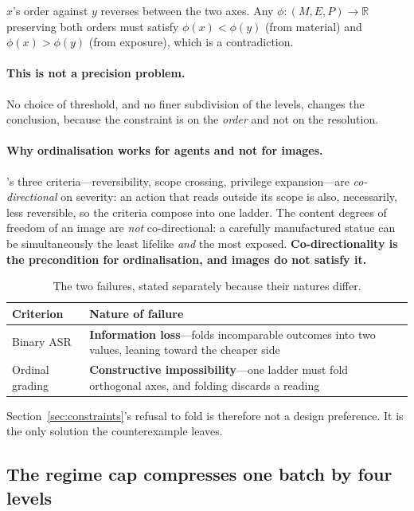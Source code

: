 \documentclass[11pt]{article}
\newcommand{\axm}{M}
\newcommand{\axe}{E}
\newcommand{\axp}{P}
\begin{document}
$x$'s order against $y$ reverses between the two axes. Any
$\phi:(\axm,\axe,\axp)\to\mathbb{R}$ preserving both orders must satisfy
$\phi(x)<\phi(y)$ (from material) and $\phi(x)>\phi(y)$ (from exposure),
which is a contradiction.

\paragraph{This is not a precision problem.}
No choice of threshold, and no finer subdivision of the levels, changes the
conclusion, because the constraint is on the \emph{order} and not on the
resolution.

\paragraph{Why ordinalisation works for agents and not for images.}
\citet{actiongraded}'s three criteria---reversibility, scope crossing,
privilege expansion---are \emph{co-directional} on severity: an action that
reads outside its scope is also, necessarily, less reversible, so the criteria
compose into one ladder. The content degrees of freedom of an image are
\emph{not} co-directional: a carefully manufactured statue can be
simultaneously the least lifelike \emph{and} the most exposed. \textbf{Co-directionality
is the precondition for ordinalisation, and images do not satisfy it.}

\begin{table}[H]
\centering\small
\begin{tabularx}{\linewidth}{@{}lX@{}}
\toprule
Criterion & Nature of failure \\
\midrule
Binary ASR & \textbf{Information loss}---folds incomparable outcomes into two
values, leaning toward the cheaper side \\
Ordinal grading & \textbf{Constructive impossibility}---one ladder must fold
orthogonal axes, and folding discards a reading \\
\bottomrule
\end{tabularx}
\caption{The two failures, stated separately because their natures differ.}
\label{tab:failnat}
\end{table}

Section~\ref{sec:constraints}'s refusal to fold is therefore not a design
preference. It is the only solution the counterexample leaves.

\subsection{The regime cap compresses one batch by four levels}
\label{sec:cap}
\end{document}
